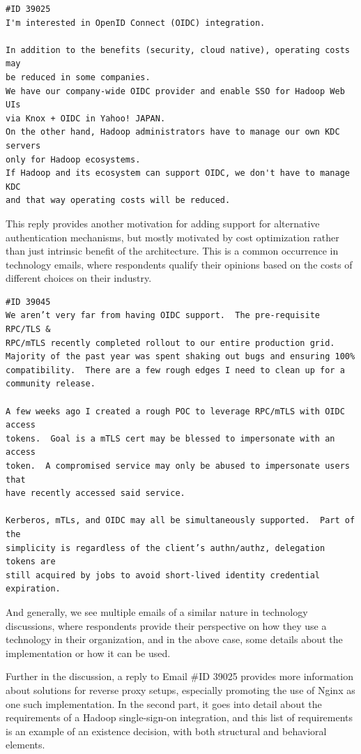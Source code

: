 \documentclass[a4paper, 12pt]{article}
\begin{document}
			\begin{verbatim}
#ID 39025
I'm interested in OpenID Connect (OIDC) integration.

In addition to the benefits (security, cloud native), operating costs may
be reduced in some companies.
We have our company-wide OIDC provider and enable SSO for Hadoop Web UIs
via Knox + OIDC in Yahoo! JAPAN.
On the other hand, Hadoop administrators have to manage our own KDC servers
only for Hadoop ecosystems.
If Hadoop and its ecosystem can support OIDC, we don't have to manage KDC
and that way operating costs will be reduced.
			\end{verbatim}
		
			This reply provides another motivation for adding support for alternative authentication mechanisms, but mostly motivated by cost optimization rather than just intrinsic benefit of the architecture. This is a common occurrence in technology emails, where respondents qualify their opinions based on the costs of different choices on their industry.
			
			\begin{verbatim}
#ID 39045
We aren’t very far from having OIDC support.  The pre-requisite RPC/TLS &
RPC/mTLS recently completed rollout to our entire production grid.
Majority of the past year was spent shaking out bugs and ensuring 100%
compatibility.  There are a few rough edges I need to clean up for a
community release.

A few weeks ago I created a rough POC to leverage RPC/mTLS with OIDC access
tokens.  Goal is a mTLS cert may be blessed to impersonate with an access
token.  A compromised service may only be abused to impersonate users that
have recently accessed said service.

Kerberos, mTLs, and OIDC may all be simultaneously supported.  Part of the
simplicity is regardless of the client’s authn/authz, delegation tokens are
still acquired by jobs to avoid short-lived identity credential expiration.
			\end{verbatim}
			
			And generally, we see multiple emails of a similar nature in technology discussions, where respondents provide their perspective on how they use a technology in their organization, and in the above case, some details about the implementation or how it can be used.
			
			Further in the discussion, a reply to Email \#ID 39025 provides more information about solutions for reverse proxy setups, especially promoting the use of Nginx as one such implementation. In the second part, it goes into detail about the requirements of a Hadoop single-sign-on integration, and this list of requirements is an example of an existence decision, with both structural and behavioral elements.
			
\end{document}
